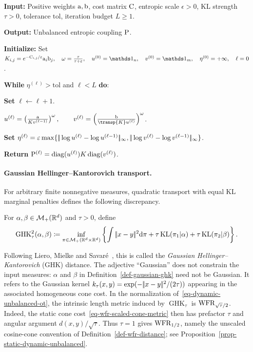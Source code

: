 \begin{alg}\label{alg:unbalanced-sinkhorn}
\textbf{Input:} Positive weights $\a,\b$, cost matrix $\C$, entropic scale $\epsilon>0$, KL strength $\tau>0$, tolerance $\mathrm{tol}$, iteration budget $L\geq1$.

\textbf{Output:} Unbalanced entropic coupling $\P$.

\textbf{Initialize:} Set
\(K_{i,j}=e^{-\C_{i,j}/\epsilon}\a_i\b_j, \quad \omega=\frac{\tau}{\tau+\epsilon}, \quad u^{(0)}=\ones_n, \quad v^{(0)}=\ones_m, \quad \eta^{(0)}=+\infty, \quad \ell=0\).

\textbf{While} \(\eta^{(\ell)}>\mathrm{tol}\) and $\ell<L$ \textbf{do}:
\begin{algblock}

\textbf{Set} \(\ell\leftarrow \ell+1\).

\(u^{(\ell)} = \left(\frac{\a}{K v^{(\ell-1)}}\right)^\omega, \qquad v^{(\ell)} = \left(\frac{\b}{\transp{K}u^{(\ell)}}\right)^\omega\).

\textbf{Set} \(\eta^{(\ell)}=\epsilon\max\{\norm{\log u^{(\ell)}-\log u^{(\ell-1)}}_\infty,\norm{\log v^{(\ell)}-\log v^{(\ell-1)}}_\infty\}\).
\end{algblock}
\algreturnskip
\textbf{Return} \(\P^{(\ell)}=\diag(u^{(\ell)})K\diag(v^{(\ell)})\).
\end{alg}

\paragraph{Gaussian Hellinger--Kantorovich transport.}
For arbitrary finite nonnegative measures, quadratic transport with equal KL marginal penalties defines the following discrepancy.
\begin{defn}\label{def-gaussian-ghk}
For $\alpha,\beta\in\Mm_+(\RR^d)$ and $\tau>0$, define
\begin{equation}\label{eq-gaussian-ghk-endpoint}
\operatorname{GHK}_\tau^2(\alpha,\beta)
\eqdef
\inf_{\pi\in\Mm_+(\RR^d\times\RR^d)}
\left\{
\int\norm{x-y}^2\d\pi
+\tau\KL(\pi_1|\alpha)
+\tau\KL(\pi_2|\beta)
\right\}.
\end{equation}
\end{defn}
	Following Liero, Mielke and Savar\'e~\cite{LieroMielkeSavareLong}, this is called the \emph{Gaussian Hellinger--Kantorovich} (GHK) distance. The adjective ``Gaussian'' does not constrain the input measures: $\alpha$ and $\beta$ in Definition~\ref{def-gaussian-ghk} need not be Gaussian. It refers to the Gaussian kernel $k_\tau(x,y)=\exp(-\norm{x-y}^2/(2\tau))$ appearing in the associated homogeneous cone cost. In the normalization of~\eqref{eq-dynamic-unbalanced-ot}, the intrinsic length metric induced by $\operatorname{GHK}_\tau$ is $\WFR_{\sqrt{\tau}/2}$. Indeed, the static cone cost~\eqref{eq-wfr-scaled-cone-metric} then has prefactor $\tau$ and angular argument $d(x,y)/\sqrt{\tau}$. Thus $\tau=1$ gives $\WFR_{1/2}$, namely the unscaled cosine-cone convention of Definition~\ref{def-wfr-distance}; see Proposition~\ref{prop-static-dynamic-unbalanced}.

